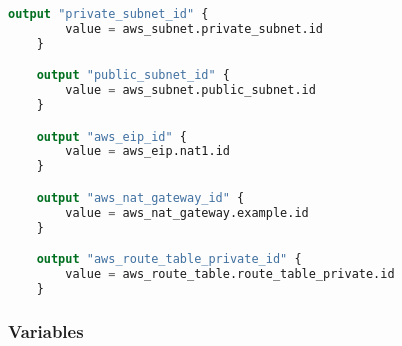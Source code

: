 \begin{lstlisting}[language=terraform]
    output "private_subnet_id" {
        value = aws_subnet.private_subnet.id
    }

    output "public_subnet_id" {
        value = aws_subnet.public_subnet.id
    }

    output "aws_eip_id" {
        value = aws_eip.nat1.id
    }

    output "aws_nat_gateway_id" {
        value = aws_nat_gateway.example.id
    }

    output "aws_route_table_private_id" {
        value = aws_route_table.route_table_private.id
    }
\end{lstlisting}

\subsubsection{
{Variables}}

